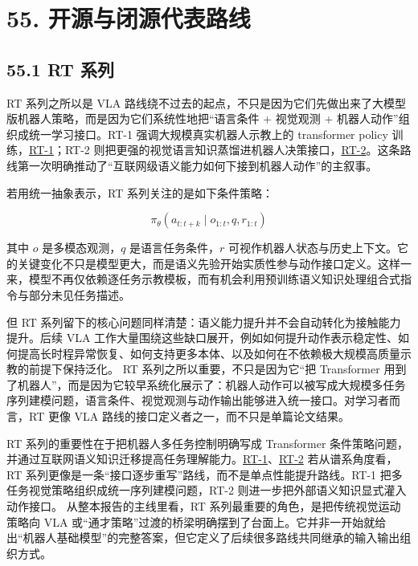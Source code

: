 \section*{55. 开源与闭源代表路线}

\subsection*{55.1 RT 系列}


RT 系列之所以是 VLA 路线绕不过去的起点，不只是因为它们先做出来了大模型版机器人策略，而是因为它们系统性地把“语言条件 + 视觉观测 + 机器人动作”组织成统一学习接口。RT-1 强调大规模真实机器人示教上的 transformer policy 训练，\href{https://robotics-transformer1.github.io/}{RT-1}；RT-2 则把更强的视觉语言知识蒸馏进机器人决策接口，\href{https://robotics-transformer2.github.io/}{RT-2}。这条路线第一次明确推动了“互联网级语义能力如何下接到机器人动作”的主叙事。

若用统一抽象表示，RT 系列关注的是如下条件策略：

\begin{equation*}
\pi_\theta(a_{t:t+k}\mid o_{1:t}, q, r_{1:t})
\end{equation*}

其中 \(o\) 是多模态观测，\(q\) 是语言任务条件，\(r\) 可视作机器人状态与历史上下文。它的关键变化不只是模型更大，而是语义先验开始实质性参与动作接口定义。这样一来，模型不再仅依赖逐任务示教模板，而有机会利用预训练语义知识处理组合式指令与部分未见任务描述。

但 RT 系列留下的核心问题同样清楚：语义能力提升并不会自动转化为接触能力提升。后续 VLA 工作大量围绕这些缺口展开，例如如何提升动作表示稳定性、如何提高长时程异常恢复、如何支持更多本体、以及如何在不依赖极大规模高质量示教的前提下保持泛化。 RT 系列之所以重要，不只是因为它“把 Transformer 用到了机器人”，而是因为它较早系统化展示了：机器人动作可以被写成大规模多任务序列建模问题，语言条件、视觉观测与动作输出能够进入统一接口。对学习者而言，RT 更像 VLA 路线的接口定义者之一，而不只是单篇论文结果。

RT 系列的重要性在于把机器人多任务控制明确写成 Transformer 条件策略问题，并通过互联网语义知识迁移提高任务理解能力。\href{https://arxiv.org/abs/2212.06817}{RT-1}、\href{https://arxiv.org/abs/2307.15818}{RT-2} 若从谱系角度看，RT 系列更像是一条“接口逐步重写”路线，而不是单点性能提升路线。RT-1 把多任务视觉策略组织成统一序列建模问题，RT-2 则进一步把外部语义知识显式灌入动作接口。 从整本报告的主线里看，RT 系列最重要的角色，是把传统视觉运动策略向 VLA 或“通才策略”过渡的桥梁明确摆到了台面上。它并非一开始就给出“机器人基础模型”的完整答案，但它定义了后续很多路线共同继承的输入输出组织方式。

